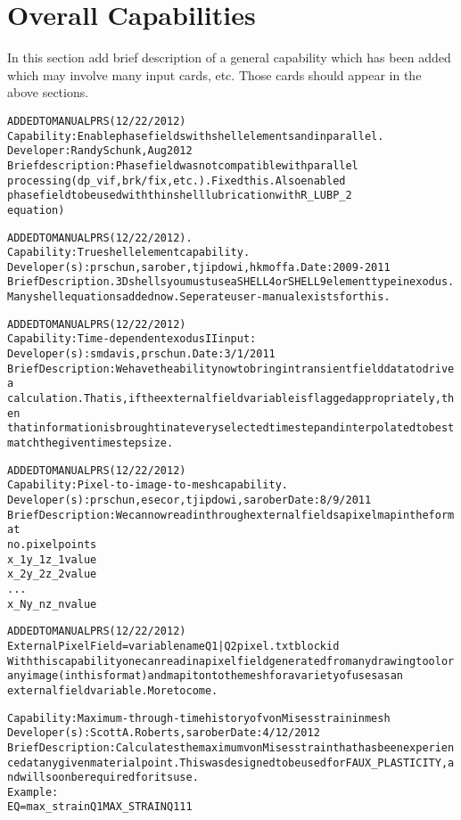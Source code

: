 \documentclass{article}
\begin{document}
\section{Overall Capabilities}
In this section add brief description of a general capability which has been added which may involve many input cards, etc. Those cards should appear in the above sections.  
\begin{alltt}

ADDED TO MANUAL PRS (12/22/2012)
Capability:  Enable phase fields with shell elements and in parallel.
Developer: Randy Schunk, Aug 2012
Brief description: Phase field was not compatible with parallel
processing (dp_vif, brk/fix, etc.).    Fixed this.   Also enabled
phase field to be used with thin shell lubrication with R_LUBP_2
equation)

ADDED TO MANUAL PRS (12/22/2012). 
Capability: True shell element capability.   
Developer(s): prschun, sarober, tjipdowi, hkmoffa.  Date: 2009-2011
Brief Description.  3D shells you must use a SHELL4 or SHELL9 element type in exodus.   
  Many shell equations added now. Seperate user-manual exists for this.  

ADDED TO MANUAL PRS (12/22/2012)
Capability: Time-dependent exodus II input:   
Developer(s): smdavis, prschun.  Date: 3/1/2011
Brief Description: We have the ability now to bring in transient field data to drive a 
  calculation.   That is, if the external field variable is flagged appropriately, then 
  that information is brought in at every selected time step and interpolated to best 
  match the given time step size.   

ADDED TO MANUAL PRS (12/22/2012)
Capability: Pixel-to-image-to-mesh capability.
Developer(s): prschun, esecor, tjipdowi, sarober Date:8/9/2011
Brief Description:  We can now read in through external fields a pixel map in the format 
  no. pixel points
  x_1 y_1 z_1 value
  x_2 y_2 z_2 value
  ...
  x_N y_n z_n value

ADDED TO MANUAL PRS (12/22/2012)
External Pixel Field = {variable name} {Q1|Q2} pixel.txt {blockid}
With this capability one can read in a pixel field generated from any drawing tool or 
  any image (in this format) and map it onto the mesh for a variety of uses as an 
  external field variable.  More to come. 

Capability:  Maximum-through-time history of von Mises strain in mesh
Developer(s):  Scott A. Roberts, sarober  Date:  4/12/2012
Brief Description:  Calculates the maximum von Mises strain that has been experienced at any given material point.  This was designed to be used for FAUX_PLASTICITY, and will soon be required for its use.
Example:  
EQ = max_strain       Q1 MAX_STRAIN    Q1 1               1


\end{alltt}
\end{document}
